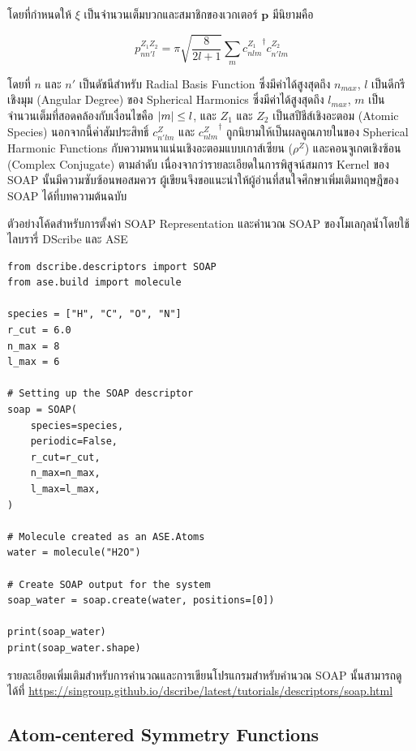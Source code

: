 \noindent โดยที่กำหนดให้ $\xi$ เป็นจำนวนเต็มบวกและสมาชิกของเวกเตอร์ $\mathbf{p}$ มีนิยามคือ 

\begin{equation}
    p^{Z_1 Z_2}_{n n' l} = \pi \sqrt{\frac{8}{2l+1}}\sum_m {c^{Z_1}_{n l m}}^{\dagger} c^{Z_2}_{n' l m}
\end{equation}

\noindent โดยที่ $n$ และ $n'$ เป็นดัชนีสำหรับ Radial Basis Function ซึ่งมีค่าได้สูงสุดถึง $n_{max}$, $l$ เป็นดีกรีเชิงมุม 
(Angular Degree) ของ Spherical Harmonics ซึ่งมีค่าได้สูงสุดถึง $l_{max}$, $m$ เป็นจำนวนเต็มที่สอดคล้องกับเงื่อนไขคือ $\abs{m} 
\leq l$, และ $Z_{1}$ และ $Z_{2}$ เป็นสปีชีส์เชิงอะตอม (Atomic Species) นอกจากนี้ค่าสัมประสิทธิ์ $c^{Z}_{n'lm}$ และ 
${c^{Z}_{nlm}}^{\dagger}$ ถูกนิยามให้เป็นผลคูณภายในของ Spherical Harmonic Functions กับความหนาแน่นเชิงอะตอมแบบเกาส์เซียน 
($\rho^Z$) และคอนจูเกตเชิงซ้อน (Complex Conjugate) ตามลำดับ\autocite{de2016} เนื่องจากว่ารายละเอียดในการพิสูจน์สมการ Kernel 
ของ SOAP นั้นมีความซับซ้อนพอสมควร ผู้เขียนจึงขอแนะนำให้ผู้อ่านที่สนใจศึกษาเพิ่มเติมทฤษฎีของ SOAP ได้ที่บทความต้นฉบับ 

ตัวอย่างโค้ดสำหรับการตั้งค่า SOAP Representation และคำนวณ SOAP ของโมเลกุลน้ำโดยใช้ไลบรารี่ DScribe และ ASE

\begin{lstlisting}[style=MyPython]
from dscribe.descriptors import SOAP
from ase.build import molecule

species = ["H", "C", "O", "N"]
r_cut = 6.0
n_max = 8
l_max = 6

# Setting up the SOAP descriptor
soap = SOAP(
    species=species,
    periodic=False,
    r_cut=r_cut,
    n_max=n_max,
    l_max=l_max,
)

# Molecule created as an ASE.Atoms
water = molecule("H2O")

# Create SOAP output for the system
soap_water = soap.create(water, positions=[0])

print(soap_water)
print(soap_water.shape)
\end{lstlisting}

รายละเอียดเพิ่มเติมสำหรับการคำนวณและการเขียนโปรแกรมสำหรับคำนวณ SOAP นั้นสามารถดูได้ที่
\url{https://singroup.github.io/dscribe/latest/tutorials/descriptors/soap.html}

\subsection{Atom-centered Symmetry Functions}
\label{ssec:acsf}

